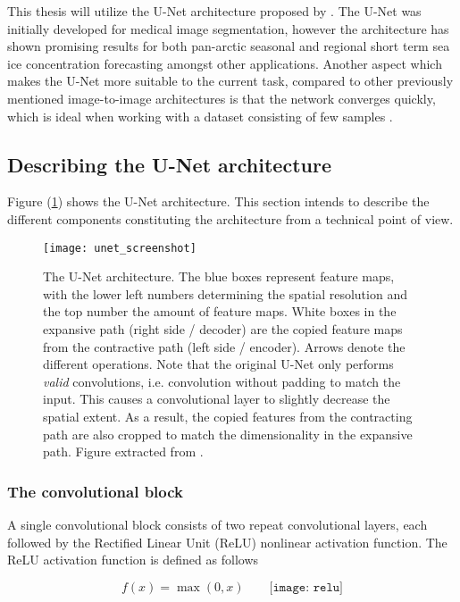 \documentclass[../main/thesis.tex]{subfiles}
\begin{document}
This thesis will utilize the U-Net architecture proposed by \citet{Ronneberger2015}. The U-Net was initially developed for medical image segmentation, however the architecture has shown promising results for both pan-arctic seasonal \citep{Andersson2021} and regional short term \citep{Grigoryev2022} sea ice concentration forecasting amongst other applications. Another aspect which makes the U-Net more suitable to the current task, compared to other previously mentioned image-to-image architectures is that the network converges quickly, which is ideal when working with a dataset consisting of few samples \citep{Ronneberger2015}.

\subsection{Describing the U-Net architecture}
Figure (\ref{fig:unet-overview}) shows the U-Net architecture. This section intends to describe the different components constituting the architecture from a technical point of view. 

\begin{figure}
    \centering
    \texttt{[image: unet\_screenshot]}
    \caption{\label{fig:unet-overview}The U-Net architecture. The blue boxes represent feature maps, with the lower left numbers determining the spatial resolution and the top number the amount of feature maps. White boxes in the expansive path (right side / decoder) are the copied feature maps from the contractive path (left side / encoder). Arrows denote the different operations. Note that the original U-Net only performs \textit{valid} convolutions, i.e. convolution without padding to match the input. This causes a convolutional layer to slightly decrease the spatial extent. As a result, the copied features from the contracting path are also cropped to match the dimensionality in the expansive path. Figure extracted from \protect\citet{Ronneberger2015}.}
\end{figure}

\subsubsection{The convolutional block}
A single convolutional block consists of two repeat convolutional layers, each followed by the Rectified Linear Unit (ReLU) \citep{Nair2010} nonlinear activation function. The ReLU activation function is defined as follows

\begin{equation}
    f(x) = \max{(0,x)} \qquad
    \texttt{[image: relu]}
\end{equation}
\end{document}
